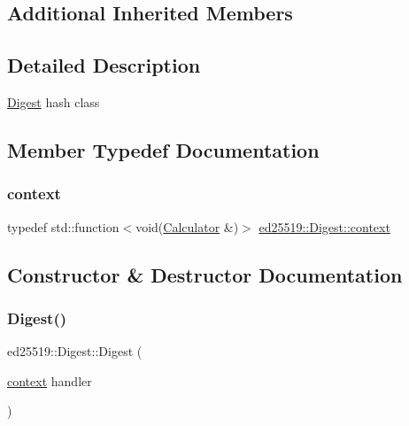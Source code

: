 \subsection*{Additional Inherited Members}


\subsection{Detailed Description}
\mbox{\hyperlink{classed25519_1_1_digest}{Digest}} hash class 

\subsection{Member Typedef Documentation}
\mbox{\label{classed25519_1_1_digest_ae086cdedc0e704dd1d869138648b2d1a}} 
\subsubsection{\texorpdfstring{context}{context}}
{\footnotesize\ttfamily typedef std\+::function$<$void(\mbox{\hyperlink{structed25519_1_1_digest_1_1_calculator}{Calculator}} \&)$>$ \mbox{\hyperlink{classed25519_1_1_digest_ae086cdedc0e704dd1d869138648b2d1a}{ed25519\+::\+Digest\+::context}}}



\subsection{Constructor \& Destructor Documentation}
\mbox{\label{classed25519_1_1_digest_a18beea9fca7dd58df55300dd5e53420d}} 
\subsubsection{\texorpdfstring{Digest()}{Digest()}\hspace{0.1cm}{\footnotesize\ttfamily [1/2]}}
{\footnotesize\ttfamily ed25519\+::\+Digest\+::\+Digest (\begin{DoxyParamCaption}\item[{\mbox{\hyperlink{classed25519_1_1_digest_ae086cdedc0e704dd1d869138648b2d1a}{context}}}]{handler }\end{DoxyParamCaption})}

